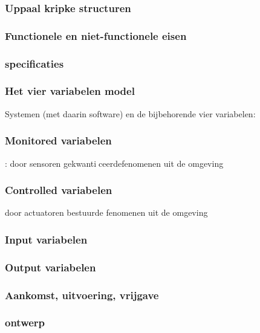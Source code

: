 \subsubsection{Uppaal kripke structuren}
















\subsubsection{Functionele en niet-functionele eisen}

\subsubsection{specificaties}

\subsubsection{Het vier variabelen model}
Systemen (met daarin software) en de bijbehorende vier variabelen:
\subsubsection{Monitored variabelen}
: door sensoren gekwanticeerdefenomenen uit de omgeving
\subsubsection{Controlled variabelen}
door actuatoren bestuurde fenomenen uit de omgeving
\subsubsection{Input variabelen}
\subsubsection{Output variabelen}




\subsubsection{Aankomst, uitvoering, vrijgave}


\subsubsection{ontwerp}


